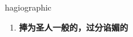 
\begin{frame}
{\huge hagiographic}
\begin{center}
\begin{enumerate}\Large
  \item \textbf{捧为圣人一般的，过分谄媚的}
\end{enumerate}
\end{center}
\end{frame}
